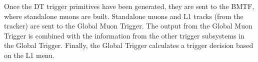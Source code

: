 \documentclass[../main.tex]{subfiles}
\begin{document}
Once the DT trigger primitives have been generated, they are sent to the BMTF, where standalone muons are built. Standalone muons and L1 tracks (from the tracker) are sent to the Global Muon Trigger. The output from the Global Muon Trigger is combined with the information from the other trigger subsystems in the Global Trigger. Finally, the Global Trigger calculates a trigger decision based on the L1 menu.



%
%
\end{document}
